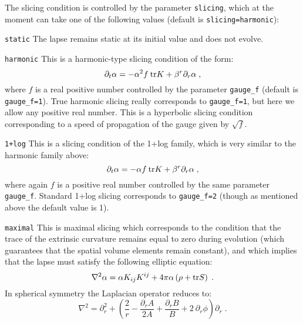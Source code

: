 \documentclass[12pt]{article}
\begin{document}
The slicing condition is controlled by the parameter \texttt{slicing}, which at the
moment can take one of the following values (default is \texttt{slicing=harmonic}):

\begin{list}{}{
\setlength{\leftmargin}{35mm}
\setlength{\labelsep}{10mm}
\setlength{\labelwidth}{20mm}}

\item[\texttt{static}] The lapse remains static at its initial value and does not evolve.

\item[\texttt{harmonic}] This is a harmonic-type slicing condition of the form:
\begin{equation}
\partial_t \alpha = - \alpha^2 f \: {\rm tr} K + \beta^r \partial_r \alpha \; ,
\end{equation}
where $f$ is a real positive number controlled by the parameter
\texttt{gauge\_f} (default is \texttt{gauge\_f=1}). True harmonic
slicing really corresponds to \texttt{gauge\_f=1}, but here we allow
any positive real number.  This is a hyperbolic slicing condition
corresponding to a speed of propagation of the gauge given by
$\sqrt{f}$.

\item[\texttt{1+log}] This is a slicing condition of the 1+log family,
  which is very similar to the harmonic family above:
\begin{equation}
\partial_t \alpha = - \alpha f \: {\rm tr} K + \beta^r \partial_r \alpha \; ,
\end{equation}
where again $f$ is a positive real number controlled by the same
parameter \texttt{gauge\_f}.  Standard 1+log slicing corresponds to 
\texttt{gauge\_f=2} (though as mentioned above the default value is 1).

\item[\texttt{maximal}] This is maximal slicing which corresponds to
  the condition that the trace of the extrinsic curvature remains
  equal to zero during evolution (which guarantees that the spatial
  volume elements remain constant), and which implies that the lapse
  must satisfy the following elliptic equation:
\begin{equation}
\nabla^2 \alpha = \alpha K_{ij} K^{ij} + 4 \pi \alpha  \left( \rho + {\rm tr} S \right) \; .
\end{equation}
In spherical symmetry the Laplacian operator reduces to:
\begin{equation}
\nabla^2 = \partial_r^2 + \left( \frac{2}{r} - \frac{\partial_r A}{2A} 
+ \frac{\partial_r B}{B} + 2 \: \partial_r \phi \right) \partial_r \; .
\end{equation}

\end{list}
\end{document}

